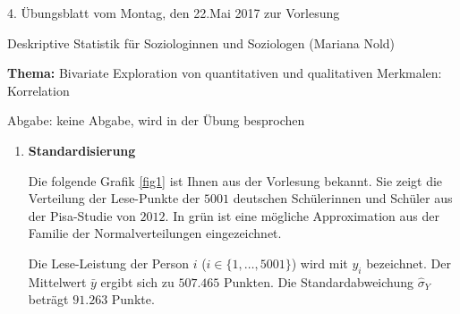 \documentclass[11pt]{article}
\newcommand{\VORLESUNG}{Deskriptive Statistik für Soziologinnen und Soziologen}
\newcommand{\STAFF}{Mariana Nold}
\newcommand{\ASSIGNMENT}{4}
\newcommand{\HANDOUT}{Montag, den 22.Mai   2017}
\newcommand{\DELIVER}{keine Abgabe, wird in der Übung besprochen}
\newcommand{\PRACTICAL}[1]{\marginpar{\tiny {\bf Aufgabe \\ abgeben!} #1}}
\newcommand{\titel}{Bivariate Exploration von  quantitativen und qualitativen 
Merkmalen: Korrelation}
\newcommand{\startwert}{14}
\newcommand{\aufgabe}[1]{\item{\bf #1}}
\begin{document}

\begin{center}
\ASSIGNMENT{}. Übungsblatt vom \HANDOUT{} zur Vorlesung 
\vspace*{0.5cm}

{\Large \VORLESUNG{}}
(\STAFF{}) 


\vspace*{0.5cm}
{\textbf{Thema:} \titel{}\\}
\vspace*{0.2cm}

{\small Abgabe: \DELIVER{}}
\vspace*{1cm}
\end{center}

\begin{enumerate}\addtocounter{enumi}{\startwert}




\aufgabe{Standardisierung} %

Die folgende Grafik \ref{fig1} ist Ihnen aus der Vorlesung bekannt. Sie zeigt die Verteilung der Lese-Punkte der $5001$ deutschen Schülerinnen und Schüler
aus der Pisa-Studie von $2012.$ In grün ist
 eine mögliche Approximation aus der  Familie der Normalverteilungen eingezeichnet. 
 
 Die Lese-Leistung der Person $i$ ($i \in \{1,\dots, 5001\}$) wird mit $y_{i}$
bezeichnet. Der Mittelwert $\bar{y}$ ergibt sich zu $507.465$ Punkten. Die Standardabweichung $\hat{\sigma}_{Y}$ beträgt $91.263$ Punkte.



\end{enumerate}
\end{document}
